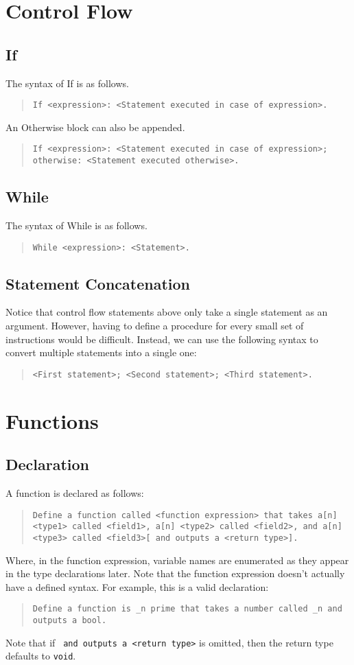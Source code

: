 \documentclass{article}
\newcommand{\code}[1]{\texttt{#1}}
\newcommand{\codeblock}[1]{\begin{quote}\code{#1}\end{quote}}
\begin{document}
\section{Control Flow}
\subsection{If}
The syntax of If is as follows.
\codeblock{If <expression>: <Statement executed in case of expression>.}
An Otherwise block can also be appended.
\codeblock{If <expression>: <Statement executed in case of expression>; otherwise: <Statement executed otherwise>.}
\subsection{While}
The syntax of While is as follows.
\codeblock{While <expression>: <Statement>.}
\subsection{Statement Concatenation}
Notice that control flow statements above only take a single statement as an argument. However, having to define a procedure for every small set of instructions would be difficult. Instead, we can use the following syntax to convert multiple statements into a single one:
\codeblock{<First statement>; <Second statement>; <Third statement>.}

\section{Functions}
\subsection{Declaration}
A function is declared as follows:

\codeblock{Define a function called <function expression> that takes a[n] <type1> called <field1>, a[n] <type2> called <field2>, and a[n] <type3> called <field3>[ and outputs a <return type>].}

Where, in the function expression, variable names are enumerated as they appear in the type declarations later. Note that the function expression doesn't actually have a defined syntax. For example, this is a valid declaration:

\codeblock{Define a function is \_{}n prime that takes a number called \_{}n and outputs a bool.}

Note that if \code{ and outputs a <return type>} is omitted, then the return type defaults to \code{void}.
\end{document}
